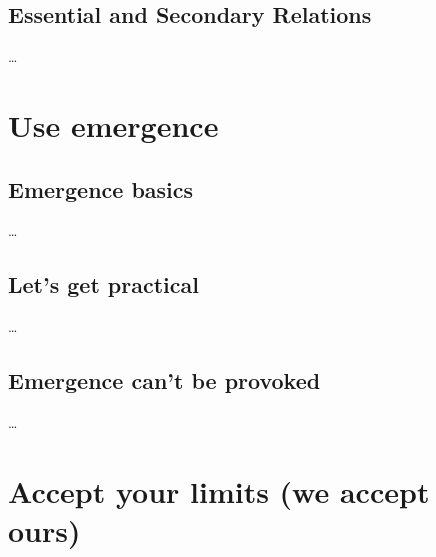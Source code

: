 %
\subsection{Essential and Secondary Relations}

  \begin{frame}{\insertsection}
    \dots
  \end{frame}

\section{Use emergence}

  \begin{frame}
    \tableofcontents[currentsection]
  \end{frame}

%
\subsection{Emergence basics}

  \begin{frame}{\insertsection}
    \dots
  \end{frame}

%
\subsection{Let's get practical}

  \begin{frame}{\insertsection}
    \dots
  \end{frame}

%
\subsection{Emergence can't be provoked}

  \begin{frame}{\insertsection}
    \dots
  \end{frame}

\section{Accept your limits (we accept ours)}

  \begin{frame}
    \tableofcontents[currentsection]
  \end{frame}

